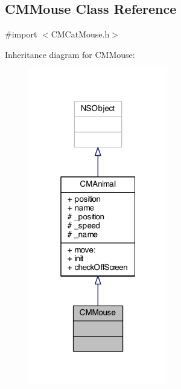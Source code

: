 \subsection{C\-M\-Mouse Class Reference}
\label{interface_c_m_mouse}


{\ttfamily \#import $<$C\-M\-Cat\-Mouse.\-h$>$}



Inheritance diagram for C\-M\-Mouse\-:
\nopagebreak
\begin{figure}[H]
\begin{center}
\leavevmode
\includegraphics[width=172pt]{interface_c_m_mouse__inherit__graph}
\end{center}
\end{figure}



